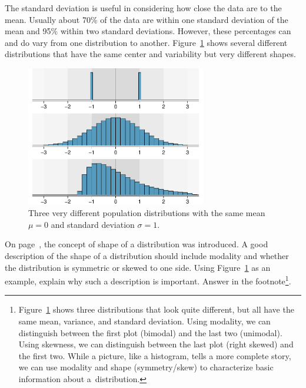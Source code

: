 The standard deviation is useful in considering how close the data are to the mean. Usually about 70\% of the data are within one standard deviation of the mean and 95\% within two standard deviations. However, these percentages can and do vary from one distribution to another. Figure~\ref{severalDiffDistWithSdOf1} shows several different distributions that have the same center and variability but very different shapes.
\begin{figure}
\centering
\includegraphics[width=0.7\textwidth]{01/figures/severalDiffDistWithSdOf1/severalDiffDistWithSdOf1}
\caption{Three very different population distributions with the same mean $\mu=0$ and standard deviation $\sigma=1$.\vspace{-3mm}}
\label{severalDiffDistWithSdOf1}
\end{figure}

\begin{exercise}
On page~\pageref{shapeFirstDiscussed}, the concept of shape of a distribution was introduced. A good description of the shape of a distribution should include modality and whether the distribution is symmetric or skewed to one side. Using Figure~\ref{severalDiffDistWithSdOf1} as an example, explain why such a description is important. Answer in the footnote\footnote{Figure~\ref{severalDiffDistWithSdOf1} shows three distributions that look quite different, but all have the same mean, variance, and standard deviation. Using modality, we can distinguish between the first plot (bimodal) and the last two (unimodal). Using skewness, we can distinguish between the last plot (right skewed) and the first two. While a picture, like a histogram, tells a more complete story, we can use modality and shape (symmetry/skew) to characterize basic information about a~distribution.}.
\end{exercise}


